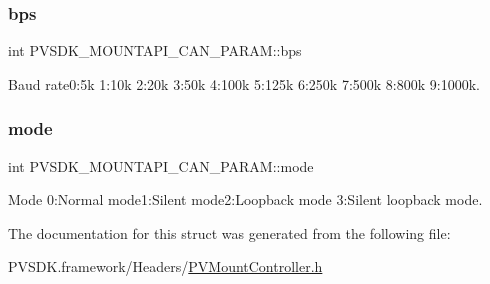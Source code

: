 \subsubsection{\texorpdfstring{bps}{bps}}
{\footnotesize\ttfamily int P\+V\+S\+D\+K\+\_\+\+M\+O\+U\+N\+T\+A\+P\+I\+\_\+\+C\+A\+N\+\_\+\+P\+A\+R\+A\+M\+::bps}



Baud rate0\+:5k 1\+:10k 2\+:20k 3\+:50k 4\+:100k 5\+:125k 6\+:250k 7\+:500k 8\+:800k 9\+:1000k. 

\mbox{\label{struct_p_v_s_d_k___m_o_u_n_t_a_p_i___c_a_n___p_a_r_a_m_a92c34f96b9fbe047605a64879c3f8c23}} 
\subsubsection{\texorpdfstring{mode}{mode}}
{\footnotesize\ttfamily int P\+V\+S\+D\+K\+\_\+\+M\+O\+U\+N\+T\+A\+P\+I\+\_\+\+C\+A\+N\+\_\+\+P\+A\+R\+A\+M\+::mode}



Mode 0\+:Normal mode1\+:Silent mode2\+:Loopback mode 3\+:Silent loopback mode. 



The documentation for this struct was generated from the following file\+:\begin{DoxyCompactItemize}
\item 
P\+V\+S\+D\+K.\+framework/\+Headers/\hyperlink{_p_v_mount_controller_8h}{P\+V\+Mount\+Controller.\+h}\end{DoxyCompactItemize}
